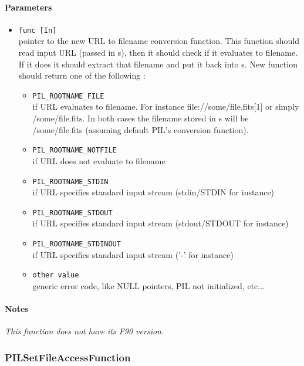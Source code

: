 \paragraph{Parameters}
\begin{itemize}
\item
{\tt func [In] } \\
pointer to the new URL to filename conversion function. This function
should read input URL (passed in s), then it should check if it evaluates 
to filename. If it does it should extract that filename and put it back into s.
New function should return one of the following :
   \begin{itemize}
   \item
   {\tt PIL\_ROOTNAME\_FILE } \\
   if URL evaluates to filename. For instance
   file://some/file.fits[1] or simply /some/file.fits. In both cases
   the filename stored in s will be /some/file.fits (assuming default
   PIL's conversion function).
   \item
   {\tt PIL\_ROOTNAME\_NOTFILE } \\
   if URL does not evaluate to filename
   \item
   {\tt PIL\_ROOTNAME\_STDIN } \\
   if URL specifies standard input stream (stdin/STDIN for instance)
   \item
   {\tt PIL\_ROOTNAME\_STDOUT } \\
   if URL specifies standard input stream (stdout/STDOUT for instance)
   \item
   {\tt PIL\_ROOTNAME\_STDINOUT } \\
   if URL specifies standard input stream ('-' for instance)
   \item
   {\tt other value } \\
   generic error code, like NULL pointers, PIL not initialized, etc...
   \end{itemize}
\end{itemize}

\paragraph{Notes\\}
{\it
This function does not have its F90 version.
}



\subsubsection{PILSetFileAccessFunction}\label{PILSetFileAccessFunction}

